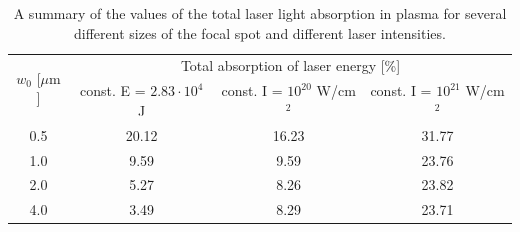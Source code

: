 \begingroup
\renewcommand*{\arraystretch}{1.5}
\begin{table}[h!]
	\centering
	\begin{tabular}{c | c | c | c}
		\multirow{2}{*}{$ w_0 $ [$ \mu\mathrm{m} $]} & \multicolumn{3}{c}{Total absorption of laser energy [\%]} \\ \cline{2-4}
		 & const. E = $ 2.83 \cdot 10^{4} $ J & const. I = $ 10^{20} $ W/cm$^2$ & const. I = $ 10^{21} $ W/cm$^2$ \\ \hline \hline
		0.5 & 20.12 & 16.23 & 31.77 \\ \hline
		1.0 & 9.59 & 9.59 & 23.76 \\ \hline
		2.0 & 5.27 & 8.26 & 23.82 \\ \hline
		4.0 & 3.49 & 8.29 & 23.71 \\
	\end{tabular}
	\caption{A summary of the values of the total laser light absorption in plasma for several different sizes of the focal spot and different laser intensities.}
	\label{table:4}
\end{table}
\endgroup

